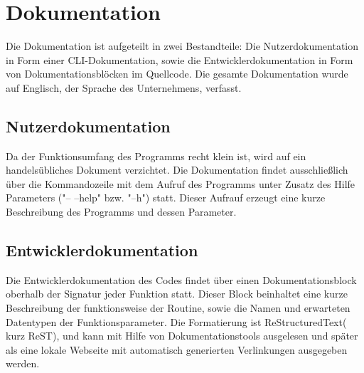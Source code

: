 \section{Dokumentation}
\label{section:dokumentationsphase}
Die Dokumentation ist aufgeteilt in zwei Bestandteile: Die Nutzerdokumentation
in Form einer CLI-Dokumentation, sowie die Entwicklerdokumentation in Form von
Dokumentationsblöcken im Quellcode. Die gesamte Dokumentation wurde auf Englisch,
der Sprache des Unternehmens, verfasst.

\subsection{Nutzerdokumentation}
Da der Funktionsumfang des Programms recht klein ist, wird auf ein handelsübliches
Dokument verzichtet. Die Dokumentation findet ausschließlich über die Kommandozeile mit dem Aufruf des Programms unter Zusatz des Hilfe Parameters ("-- --help" bzw. "--h") statt.
Dieser Aufrauf erzeugt eine kurze Beschreibung des Programms und dessen Parameter.

\subsection{Entwicklerdokumentation}
Die Entwicklerdokumentation des Codes findet über einen
Dokumentationsblock oberhalb der Signatur jeder Funktion statt. Dieser Block beinhaltet eine kurze Beschreibung der funktionsweise der Routine, sowie die Namen und erwarteten Datentypen der Funktionsparameter. Die Formatierung ist ReStructuredText( kurz ReST), und kann mit Hilfe von Dokumentationstools ausgelesen und später als eine lokale Webseite mit automatisch generierten Verlinkungen ausgegeben werden.
